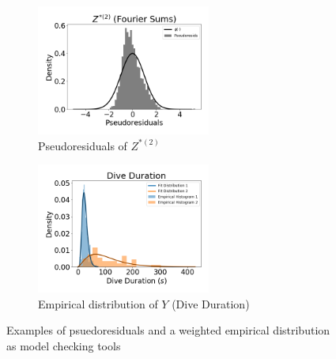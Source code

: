 \begin{figure}[ht]
    \begin{subfigure}{0.45\textwidth}
    	\centering
    	\includegraphics[width=2.25in]{../Plots/CarHHMM2_psedoresids_ahat.png}
    	\caption{Pseudoresiduals of $Z^{*(2)}$}
    	\label{fig:pseudoresids}
    \end{subfigure}
    \begin{subfigure}{0.45\textwidth}
    	\centering
    	\includegraphics[width=2.25in]{../Plots/CarHHMM2_empirical_hist_dive_duration.png}
    	\caption{Empirical distribution of $Y$ (Dive Duration)}
    	\label{fig:empirical_dist}
    \end{subfigure}
    \caption{Examples of psuedoresiduals and a weighted empirical distribution as model checking tools}
    \label{fig:model_checking}
\end{figure}